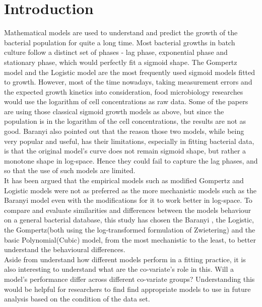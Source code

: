 \documentclass[11pt]{article}
\begin{document}
\section{Introduction}
Mathematical models are used to understand and predict the growth of the bacterial population for quite a long time. Most bacterial growths in batch culture follow a distinct set of phases - lag phase, exponential phase and stationary phase, which would perfectly fit a sigmoid shape. The Gompertz model\parencite{gompertz1825xxiv} and the Logistic model \parencite{verhulst1838notice} are the most frequently used sigmoid models fitted to growth\parencite{tjorve2017use}. However, most of the time nowadays, taking measurement errors and the expected growth kinetics into consideration, food microbiology researches would use the logarithm of cell concentrations as raw data. Some of the papers are using those classical sigmoid growth models as above, but since the population is in the logarithm of the cell concentrations, the results are not as good\parencite{baranyi2011modelling}.
Baranyi also pointed out that the reason those two models, while being very popular and useful, has their limitations, especially in fitting bacterial data, is that the original model's curve does not remain sigmoid shape, but rather a monotone shape in log-space. Hence they could fail to capture the lag phases, and so that the use of such models are limited\parencite{baranyi2011modelling}.\\
It has been argued that the empirical models such as modified Gompertz and Logistic models were not as preferred as the more mechanistic models such as the Baranyi model even with the modifications for it to work better in log-space\parencite{juneja2009mathematical}. To compare and evaluate similarities and differences between the models behaviour on a general bacterial database, this study has chosen the Baranyi \parencite{baranyi1993non}, the Logistic, the Gompertz(both using the log-transformed formulation of Zwietering)\parencite{zwietering1990modeling} and the basic Polynomial(Cubic) model, from the most mechanistic to the least, to better understand the behavioural differences. \\
Aside from understand how different models perform in a fitting practice, it is also interesting to understand what are the co-variate's role in this. Will a model's performance differ across different co-variate groups? Understanding this would be helpful for researchers to find find appropriate models to use in future analysis based on the condition of the data set.
\end{document}
